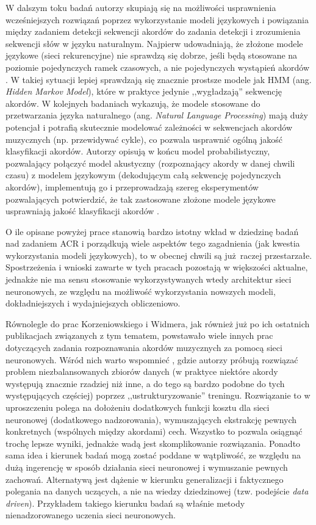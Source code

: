 W dalszym toku badań autorzy skupiają się na możliwości usprawnienia wcześniejszych rozwiązań poprzez wykorzystanie modeli językowych i powiązania między zadaniem detekcji sekwencji akordów do zadania detekcji i zrozumienia sekwencji słów w języku naturalnym. Najpierw udowadniają, że złożone modele językowe (sieci rekurencyjne) nie sprawdzą się dobrze, jeśli będą stosowane na poziomie pojedynczych ramek czasowych, a nie pojedynczych wystąpień akordów \cite{korzeniowski_futility_2017}. W takiej sytuacji lepiej sprawdzają się znacznie prostsze modele jak HMM (ang. \emph{Hidden Markov Model}), które w praktyce jedynie ,,wygładzają'' sekwencję akordów. W kolejnych badaniach \cite{korzeniowski_large-scale_2018} wykazują, że modele stosowane do przetwarzania języka naturalnego (ang. \emph{Natural Language Processing}) mają duży potencjał i potrafią skutecznie modelować zależności w sekwencjach akordów muzycznych (np. przewidywać cykle), co pozwala usprawnić ogólną jakość klasyfikacji akordów. Autorzy opisują w końcu model probabilistyczny, pozwalający połączyć model akustyczny (rozpoznający akordy w danej chwili czasu) z modelem językowym (dekodującym całą sekwencję pojedynczych akordów), implementują go i przeprowadzają szereg eksperymentów pozwalających potwierdzić, że tak zastosowane złożone modele językowe usprawniają jakość klasyfikacji akordów \cite{korzeniowski_improved_2018}.

O ile opisane powyżej prace stanowią bardzo istotny wkład w dziedzinę badań nad zadaniem ACR i porządkują wiele aspektów tego zagadnienia (jak kwestia wykorzystania modeli językowych), to w obecnej chwili są już raczej przestarzałe. Spostrzeżenia i wnioski zawarte w tych pracach pozostają w większości aktualne, jednakże nie ma sensu stosowanie wykorzystywanych wtedy architektur sieci neuronowych, ze względu na możliwość wykorzystania nowszych modeli, dokładniejszych i wydajniejszych obliczeniowo.

Równolegle do prac Korzeniowskiego i Widmera, jak również już po ich ostatnich publikacjach związanych z tym tematem, powstawało wiele innych prac dotyczących zadania rozpoznawania akordów muzycznych za pomocą sieci neuronowych. Wśród nich warto wspomnieć \cite{mcfee_structured_2017}, gdzie autorzy próbują rozwiązać problem niezbalansowanych zbiorów danych (w praktyce niektóre akordy występują znacznie rzadziej niż inne, a do tego są bardzo podobne do tych występujących częściej) poprzez ,,ustrukturyzowanie'' treningu. Rozwiązanie to w uproszczeniu polega na dołożeniu dodatkowych funkcji kosztu dla sieci neuronowej (dodatkowego nadzorowania), wymuszających ekstrakcję pewnych konkretnych (wspólnych między akordami) cech. Wszystko to pozwala osiągnąć trochę lepsze wyniki, jednakże wadą jest skomplikowanie rozwiązania. Ponadto sama idea i kierunek badań mogą zostać poddane w wątpliwość, ze względu na dużą ingerencję w sposób działania sieci neuronowej i wymuszanie pewnych zachowań. Alternatywą jest dążenie w kierunku generalizacji i faktycznego polegania na danych uczących, a nie na wiedzy dziedzinowej (tzw. podejście \emph{data driven}). Przykładem takiego kierunku badań są właśnie metody nienadzorowanego uczenia sieci neuronowych.

